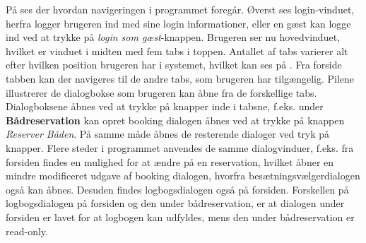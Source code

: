 På  ses der hvordan navigeringen i programmet foregår.
Øverst ses login-vinduet, herfra logger brugeren ind med sine login informationer, eller en gæst kan logge ind ved at trykke på \textit{login som gæst}-knappen.
Brugeren ser nu hovedvinduet, hvilket er vinduet i midten med fem tabs i toppen.
Antallet af tabs varierer alt efter hvilken position brugeren har i systemet, hvilket kan ses på . 
Fra forside tabben kan der navigeres til de andre tabs, som brugeren har tilgængelig.
Pilene illustrerer de dialogbokse som brugeren kan åbne fra de forskellige tabs.
Dialogboksene åbnes ved at trykke på knapper inde i tabsne, f.eks. under  \textbf{Bådreservation} kan opret booking dialogen åbnes ved at trykke på knappen \textit{Reserver Båden}. 
På samme måde åbnes de resterende dialoger ved tryk på knapper.
Flere steder i programmet anvendes de samme dialogvinduer, f.eks. fra forsiden findes en mulighed for at ændre på en reservation, hvilket åbner en mindre modificeret udgave af booking dialogen, hvorfra besætningsvælgerdialogen også kan åbnes.
Desuden findes logbogsdialogen også på forsiden.
Forskellen på logbogsdialogen på forsiden og den under bådreservation, er at dialogen under forsiden er lavet for at logbogen kan udfyldes, mens den under bådreservation er read-only.

